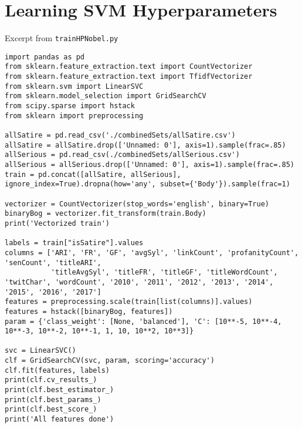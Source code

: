 \documentclass [12 pt] {report}
\begin{document}
\section{Learning SVM Hyperparameters}
Excerpt from \texttt{trainHPNobel.py}
\begin{lstlisting}
import pandas as pd
from sklearn.feature_extraction.text import CountVectorizer
from sklearn.feature_extraction.text import TfidfVectorizer
from sklearn.svm import LinearSVC
from sklearn.model_selection import GridSearchCV
from scipy.sparse import hstack
from sklearn import preprocessing

allSatire = pd.read_csv('./combinedSets/allSatire.csv')
allSatire = allSatire.drop(['Unnamed: 0'], axis=1).sample(frac=.85)
allSerious = pd.read_csv(./combinedSets/allSerious.csv')
allSerious = allSerious.drop(['Unnamed: 0'], axis=1).sample(frac=.85)
train = pd.concat([allSatire, allSerious], ignore_index=True).dropna(how='any', subset={'Body'}).sample(frac=1)

vectorizer = CountVectorizer(stop_words='english', binary=True)
binaryBog = vectorizer.fit_transform(train.Body)
print('Vectorized train')

labels = train["isSatire"].values
columns = ['ARI', 'FR', 'GF', 'avgSyl', 'linkCount', 'profanityCount', 'senCount', 'titleARI',
           'titleAvgSyl', 'titleFR', 'titleGF', 'titleWordCount', 'twitChar', 'wordCount', '2010', '2011', '2012', '2013', '2014', '2015', '2016', '2017']
features = preprocessing.scale(train[list(columns)].values)
features = hstack([binaryBog, features])
param = {'class_weight': [None, 'balanced'], 'C': [10**-5, 10**-4, 10**-3, 10**-2, 10**-1, 1, 10, 10**2, 10**3]}

svc = LinearSVC()
clf = GridSearchCV(svc, param, scoring='accuracy')
clf.fit(features, labels)
print(clf.cv_results_)
print(clf.best_estimator_)
print(clf.best_params_)
print(clf.best_score_)
print('All features done')
\end{lstlisting}
\end{document}
